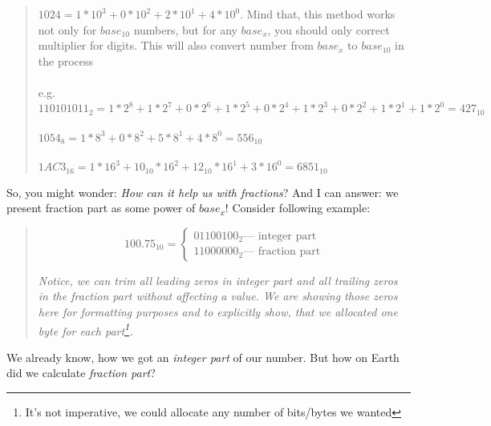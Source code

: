 \documentclass[../../what-is-computer.tex]{subfiles}
\begin{document}
    \begin{quote}
        $1024 = 1 * 10^3 + 0 * 10^2 + 2 * 10^1 + 4 * 10^0$. Mind that, this method works not only for $base_{10}$ numbers, but for any $base_x$, you should only correct
        multiplier for digits. This will also convert number from $base_x$ to $base_{10}$ in the process\\\\
        e.g.\\
        $110101011_2 = 1 * 2^8 + 1 * 2^7 + 0 * 2^6 + 1 * 2^5 + 0 * 2^4 + 1 * 2^3 + 0 * 2^2 + 1 * 2^1 + 1 * 2^0 = 427_{10}$ \\\\                    
        $1054_8 = 1 * 8^3 + 0 * 8^2 + 5 * 8^1 + 4 * 8^0 = 556_{10}$\\\\
        $1AC3_{16} = 1 * 16^3 + 10_{10} * 16^2 + 12_{10} * 16^1 + 3 * 16^0 = 6851_{10}$
    \end{quote}

    So, you might wonder: \emph{How can it help us with fractions}? And I can answer: we present fraction part as some power of $base_x$! Consider following
    example:

    \begin{quote}
        \begin{equation*}
            100.75_{10} = \begin{cases}
                    01100100_2 \text{--- integer part}\\
                    11000000_2 \text{--- fraction part}
                \end{cases}
            \end{equation*}

            \emph{
                Notice, we can trim all leading zeros in \emph{integer part} and all trailing zeros in the \emph{fraction part} without affecting a value.
                We are showing those zeros here for formatting purposes and to explicitly show, that we allocated one byte for each part\footnote{It's not imperative,
                we could allocate any number of bits/bytes we wanted}.
            }
    \end{quote}

    We already know, how we got an \emph{integer part} of our number. But how on Earth did we calculate \emph{fraction part}?
\end{document}
